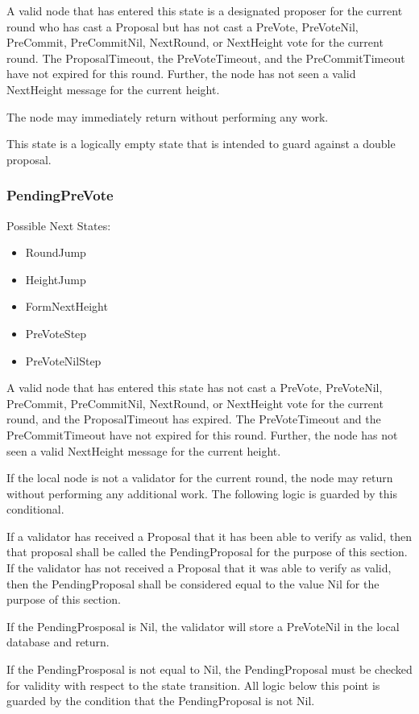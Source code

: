 A valid node that has entered this state is a designated proposer for
the current round who has cast a Proposal but has not cast a PreVote,
PreVoteNil, PreCommit, PreCommitNil, NextRound, or NextHeight vote for
the current round.
The ProposalTimeout, the PreVoteTimeout, and the PreCommitTimeout have
not expired for this round.
Further, the node has not seen a valid NextHeight message for the
current height.

The node may immediately return without performing any work.

This state is a logically empty state that is intended to guard against
a double proposal.


\subsubsection{PendingPreVote}

Possible Next States:

\begin{itemize}
    \item RoundJump
    \item HeightJump
    \item FormNextHeight
    \item PreVoteStep
    \item PreVoteNilStep
\end{itemize}

A valid node that has entered this state has not cast a PreVote,
PreVoteNil, PreCommit, PreCommitNil, NextRound, or NextHeight vote for
the current round, and the ProposalTimeout has expired.
The PreVoteTimeout and the PreCommitTimeout have not expired for this
round.
Further, the node has not seen a valid NextHeight message for the
current height.

If the local node is not a validator for the current round, the node
may return without performing any additional work.
The following logic is guarded by this conditional.

If a validator has received a Proposal that it has been able to verify
as valid, then that proposal shall be called the PendingProposal for
the purpose of this section.
If the validator has not received a Proposal that it was able to verify
as valid, then the PendingProposal shall be considered equal to the
value Nil for the purpose of this section.

If the PendingProsposal is Nil, the validator will store a PreVoteNil
in the local database and return.

If the PendingProsposal is not equal to Nil, the PendingProposal must
be checked for validity with respect to the state transition.
All logic below this point is guarded by the condition that the
PendingProposal is not Nil.

